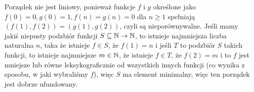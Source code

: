 \documentclass{../note}
\begin{document}
\begin{rozwiazanie}
Porządek nie jest liniowy, ponieważ funkcje $f$ i $g$ określone jako $f(0) = 0, g(0) = 1, f(n) = g(n) = 0$ dla $n \geq 1$ spełniają $(f(1), f(2)) = (g(1), g(2))$, czyli są nieporównywalne. Jeśli mamy jakiś niepusty podzbiór funkcji $S \subseteq \mathbb{N} \to \mathbb{N}$, to istnieje najmniejsza liczba naturalna $n$, taka że istnieje $f \in S$, że $f(1) = n$ i jeśli $T$ to podzbiór $S$ takich funkcji, to istnieje najmniejsze $m \in \mathbb{N}$, że istnieje $f \in T$, że $f(2) = m$ i to $f$ jest mniejsze lub równe leksykograficznie od wszystkich innych funkcji (co wynika z sposobu, w jaki wybraliśmy $f$), więc $S$ ma element minimalny, więc ten porządek jest dobrze ufundowany.
\end{rozwiazanie}
\end{document}
